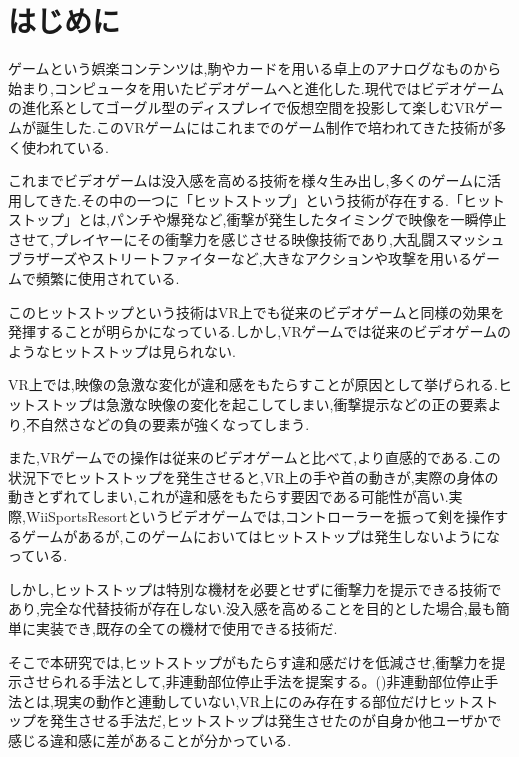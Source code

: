 \documentclass[uplatex]{jsarticle}
\begin{document}

\vspace{3mm}
\setcounter{page}{1}  %

\section{はじめに}
ゲームという娯楽コンテンツは,駒やカードを用いる卓上のアナログなものから始まり,コンピュータを用いたビデオゲームへと進化した.現代ではビデオゲームの進化系としてゴーグル型のディスプレイで仮想空間を投影して楽しむVRゲームが誕生した.このVRゲームにはこれまでのゲーム制作で培われてきた技術が多く使われている.

これまでビデオゲームは没入感を高める技術を様々生み出し,多くのゲームに活用してきた.その中の一つに「ヒットストップ」という技術が存在する.「ヒットストップ」とは,パンチや爆発など,衝撃が発生したタイミングで映像を一瞬停止させて,プレイヤーにその衝撃力を感じさせる映像技術であり,大乱闘スマッシュブラザーズやストリートファイターなど,大きなアクションや攻撃を用いるゲームで頻繁に使用されている.

このヒットストップという技術はVR上でも従来のビデオゲームと同様の効果を発揮することが明らかになっている.\cite{HitStop}しかし,VRゲームでは従来のビデオゲームのようなヒットストップは見られない.

VR上では,映像の急激な変化が違和感をもたらすことが原因として挙げられる.\cite{InstantChange}ヒットストップは急激な映像の変化を起こしてしまい,衝撃提示などの正の要素より,不自然さなどの負の要素が強くなってしまう.

また,VRゲームでの操作は従来のビデオゲームと比べて,より直感的である.この状況下でヒットストップを発生させると,VR上の手や首の動きが,実際の身体の動きとずれてしまい,これが違和感をもたらす要因である可能性が高い.実際,WiiSportsResortというビデオゲームでは,コントローラーを振って剣を操作するゲームがあるが,このゲームにおいてはヒットストップは発生しないようになっている.

しかし,ヒットストップは特別な機材を必要とせずに衝撃力を提示できる技術であり,完全な代替技術が存在しない.没入感を高めることを目的とした場合,最も簡単に実装でき,既存の全ての機材で使用できる技術だ.

そこで本研究では,ヒットストップがもたらす違和感だけを低減させ,衝撃力を提示させられる手法として,非連動部位停止手法を提案する。()非連動部位停止手法とは,現実の動作と連動していない,VR上にのみ存在する部位だけヒットストップを発生させる手法だ,ヒットストップは発生させたのが自身か他ユーザかで感じる違和感に差があることが分かっている.\cite{MultiPlayerHitStop}
\end{document}
